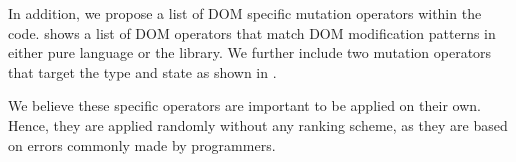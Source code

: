 


In addition, we propose a list of DOM specific mutation operators within the \javascript code.  shows a list of DOM
operators that match DOM modification patterns in either pure \javascript language or the \jquery library. We further include two mutation operators that target the  type and state as shown in .

We believe these specific operators are important to be applied on their own. Hence, they  are applied randomly without any ranking scheme, as they are based on  errors commonly made by programmers.
